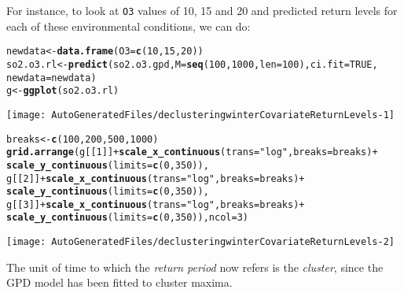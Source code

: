 \documentclass[10pt]{article}\usepackage[]{graphicx}\usepackage[]{color}
\makeatletter
\def\maxwidth{ %
  \ifdim\Gin@nat@width>\linewidth
    \linewidth
  \else
    \Gin@nat@width
  \fi
}
\newcommand{\hlnum}[1]{\textcolor[rgb]{0.686,0.059,0.569}{#1}}%
\newcommand{\hlstr}[1]{\textcolor[rgb]{0.192,0.494,0.8}{#1}}%
\newcommand{\hlopt}[1]{\textcolor[rgb]{0,0,0}{#1}}%
\newcommand{\hlstd}[1]{\textcolor[rgb]{0.345,0.345,0.345}{#1}}%
\newcommand{\hlkwb}[1]{\textcolor[rgb]{0.69,0.353,0.396}{#1}}%
\newcommand{\hlkwc}[1]{\textcolor[rgb]{0.333,0.667,0.333}{#1}}%
\newcommand{\hlkwd}[1]{\textcolor[rgb]{0.737,0.353,0.396}{\textbf{#1}}}%
\newenvironment{kframe}{%
 \def\at@end@of@kframe{}%
 \ifinner\ifhmode%
  \def\at@end@of@kframe{\end{minipage}}%
  \begin{minipage}{\columnwidth}%
 \fi\fi%
 \def\FrameCommand##1{\hskip\@totalleftmargin \hskip-\fboxsep
 \colorbox{shadecolor}{##1}\hskip-\fboxsep
     \hskip-\linewidth \hskip-\@totalleftmargin \hskip\columnwidth}%
 \MakeFramed {\advance\hsize-\width
   \@totalleftmargin\z@ \linewidth\hsize
   \@setminipage}}%
 {\par\unskip\endMakeFramed%
 \at@end@of@kframe}
\newenvironment{knitrout}{}{} %
\makeatother
\begin{document}
For instance, to look at {\tt O3} values of 10, 15 and 20 and predicted return levels for each of these environmental conditions, we can do:

\begin{knitrout}
\color{fgcolor}\begin{kframe}
\begin{alltt}
\hlstd{newdata} \hlkwb{<-} \hlkwd{data.frame}\hlstd{(}\hlkwc{O3}\hlstd{=}\hlkwd{c}\hlstd{(}\hlnum{10}\hlstd{,}\hlnum{15}\hlstd{,}\hlnum{20}\hlstd{))}
\hlstd{so2.o3.rl} \hlkwb{<-} \hlkwd{predict}\hlstd{(so2.o3.gpd,}\hlkwc{M}\hlstd{=}\hlkwd{seq}\hlstd{(}\hlnum{100}\hlstd{,}\hlnum{1000}\hlstd{,}\hlkwc{len}\hlstd{=}\hlnum{100}\hlstd{),}\hlkwc{ci.fit}\hlstd{=}\hlnum{TRUE}\hlstd{,}
                     \hlkwc{newdata}\hlstd{=newdata)}
\hlstd{g} \hlkwb{<-} \hlkwd{ggplot}\hlstd{(so2.o3.rl)}
\end{alltt}
\end{kframe}
\texttt{[image: AutoGeneratedFiles/declusteringwinterCovariateReturnLevels-1]} 
\begin{kframe}\begin{alltt}
\hlstd{breaks} \hlkwb{<-} \hlkwd{c}\hlstd{(}\hlnum{100}\hlstd{,}\hlnum{200}\hlstd{,}\hlnum{500}\hlstd{,}\hlnum{1000}\hlstd{)}
\hlkwd{grid.arrange}\hlstd{(g[[}\hlnum{1}\hlstd{]]} \hlopt{+} \hlkwd{scale_x_continuous}\hlstd{(}\hlkwc{trans}\hlstd{=}\hlstr{"log"}\hlstd{,}\hlkwc{breaks}\hlstd{=breaks)} \hlopt{+}
                 \hlkwd{scale_y_continuous}\hlstd{(}\hlkwc{limits}\hlstd{=}\hlkwd{c}\hlstd{(}\hlnum{0}\hlstd{,}\hlnum{350}\hlstd{)),}
             \hlstd{g[[}\hlnum{2}\hlstd{]]} \hlopt{+} \hlkwd{scale_x_continuous}\hlstd{(}\hlkwc{trans}\hlstd{=}\hlstr{"log"}\hlstd{,}\hlkwc{breaks}\hlstd{=breaks)} \hlopt{+}
                 \hlkwd{scale_y_continuous}\hlstd{(}\hlkwc{limits}\hlstd{=}\hlkwd{c}\hlstd{(}\hlnum{0}\hlstd{,}\hlnum{350}\hlstd{)),}
             \hlstd{g[[}\hlnum{3}\hlstd{]]} \hlopt{+} \hlkwd{scale_x_continuous}\hlstd{(}\hlkwc{trans}\hlstd{=}\hlstr{"log"}\hlstd{,}\hlkwc{breaks}\hlstd{=breaks)} \hlopt{+}
                 \hlkwd{scale_y_continuous}\hlstd{(}\hlkwc{limits}\hlstd{=}\hlkwd{c}\hlstd{(}\hlnum{0}\hlstd{,}\hlnum{350}\hlstd{)),}\hlkwc{ncol}\hlstd{=}\hlnum{3}\hlstd{)}
\end{alltt}
\end{kframe}
\texttt{[image: AutoGeneratedFiles/declusteringwinterCovariateReturnLevels-2]} 

\end{knitrout}
The unit of time to which the {\it return period} now refers is the {\it cluster}, since the GPD model has been fitted to cluster maxima.
%
\end{document}
